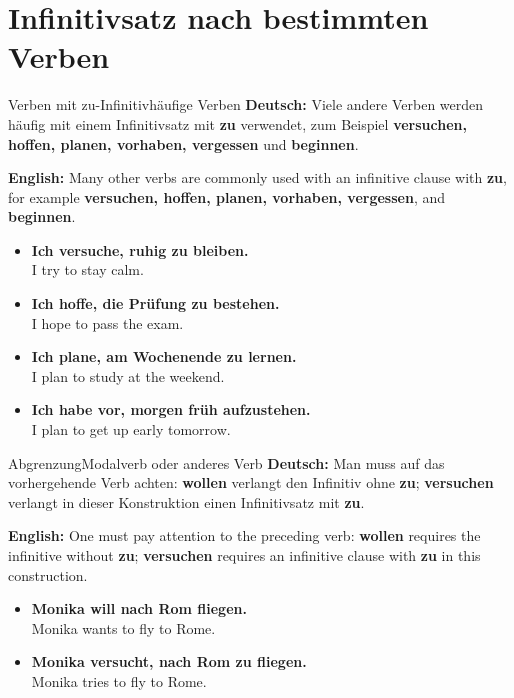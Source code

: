 \documentclass[a4paper,11pt]{article}
\newcommand{\GermanText}[1]{\textbf{Deutsch: }#1\par}
\newcommand{\EnglishText}[1]{{\small\color{SoftGray}\textbf{English: }#1\par}}
\newcommand{\ExampleItem}[2]{\item \textbf{#1}\\{\small\color{SoftGray}#2}}
\begin{document}
    \section{Infinitivsatz nach bestimmten Verben}

        \begin{grammarentry}{Verben mit zu-Infinitiv}{häufige Verben}
            \GermanText{Viele andere Verben werden häufig mit einem Infinitivsatz mit \textbf{zu} verwendet, zum Beispiel \textbf{versuchen, hoffen, planen, vorhaben, vergessen} und \textbf{beginnen}.}
            \EnglishText{Many other verbs are commonly used with an infinitive clause with \textbf{zu}, for example \textbf{versuchen, hoffen, planen, vorhaben, vergessen}, and \textbf{beginnen}.}
        \end{grammarentry}

        \begin{exbox}
            \begin{itemize}
                \ExampleItem{Ich versuche, ruhig zu bleiben.}{I try to stay calm.}
                \ExampleItem{Ich hoffe, die Prüfung zu bestehen.}{I hope to pass the exam.}
                \ExampleItem{Ich plane, am Wochenende zu lernen.}{I plan to study at the weekend.}
                \ExampleItem{Ich habe vor, morgen früh aufzustehen.}{I plan to get up early tomorrow.}
            \end{itemize}
        \end{exbox}

        \begin{grammarentry}{Abgrenzung}{Modalverb oder anderes Verb}
            \GermanText{Man muss auf das vorhergehende Verb achten: \textbf{wollen} verlangt den Infinitiv ohne \textbf{zu}; \textbf{versuchen} verlangt in dieser Konstruktion einen Infinitivsatz mit \textbf{zu}.}
            \EnglishText{One must pay attention to the preceding verb: \textbf{wollen} requires the infinitive without \textbf{zu}; \textbf{versuchen} requires an infinitive clause with \textbf{zu} in this construction.}
        \end{grammarentry}

        \begin{exbox}
            \begin{itemize}
                \ExampleItem{Monika will nach Rom fliegen.}{Monika wants to fly to Rome.}
                \ExampleItem{Monika versucht, nach Rom zu fliegen.}{Monika tries to fly to Rome.}
            \end{itemize}
        \end{exbox}
\end{document}
